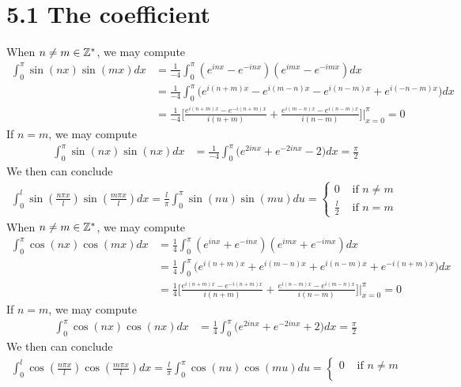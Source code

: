 \documentclass{report}
\begin{document}
\section{5.1 The coefficient}
\begin{mdframed}
When $n\neq m \in\mathbb{Z}^*$, we may compute 
\begin{align*}
\int_0^{\pi} \sin (nx) \sin (mx)dx &= \frac{1}{-4}\int_0^\pi (e^{i nx}- e^{-inx})(e^{imx}-e^{-imx})dx \\
&= \frac{1}{-4}\int_0^{\pi} \big(e^{i(n+m)x} -e^{i (m-n)x}-e^{i(n-m)x}+e^{i (-n-m)x} \big)dx\\
&=\frac{1}{-4}\Big[ \frac{e^{i(n+m)x}- e^{-i(n+m)x}}{i(n+m)}+ \frac{e^{i(m-n)x}-e^{i(n-m)x}}{i(n-m)} \Big] \Big|_{x=0}^{\pi}=0
\end{align*}
If $n=m$, we may compute 
 \begin{align*}
\int_0^{\pi} \sin(nx)\sin (nx)dx &= \frac{1}{-4}\int_0^{\pi} \big( e^{2inx}+e^{-2inx}-2 \big)dx= \frac{\pi }{2}
\end{align*}
We then can conclude 
\begin{align*}
\int_0^l \sin (\frac{n \pi x}{l}) \sin (\frac{m \pi x}{l})dx=\frac{l}{\pi}\int_0^\pi \sin (n u)\sin (m u)du= \begin{cases}
  0& \text{ if $n\neq m$ }\\
  \frac{l}{2}& \text{ if $n=m$ }
\end{cases}
\end{align*}
When $n\neq m \in\mathbb{Z}^*$, we may compute 
\begin{align*}
\int_0^{\pi} \cos (nx) \cos (mx)dx &= \frac{1}{4}\int_0^\pi (e^{i nx}+ e^{-inx})(e^{imx}+e^{-imx})dx \\
&= \frac{1}{4}\int_0^{\pi} \big(e^{i(n+m)x} +e^{i (m-n)x}+e^{i(n-m)x}+e^{-i(n+m)x} \big)dx\\
&=\frac{1}{4}\Big[ \frac{e^{i(n+m)x}- e^{-i(n+m)x}}{i(n+m)}+ \frac{e^{i(n-m)x}-e^{i(m-n)x}}{i(n-m)} \Big] \Big|_{x=0}^{\pi}=0
\end{align*}
If $n=m$, we may compute 
 \begin{align*}
\int_0^{\pi} \cos(nx)\cos (nx)dx &= \frac{1}{4}\int_0^{\pi} \big( e^{2inx}+e^{-2inx}+2 \big)dx= \frac{\pi }{2}
\end{align*}
We then can conclude 
\begin{align*}
\int_0^l \cos (\frac{n \pi x}{l}) \cos (\frac{m \pi x}{l})dx=\frac{l}{\pi}\int_0^\pi \cos (n u)\cos (m u)du= \begin{cases}
  0& \text{ if $n\neq m$ }\\

\end{cases}
\end{align*}
\end{mdframed}
\end{document}
